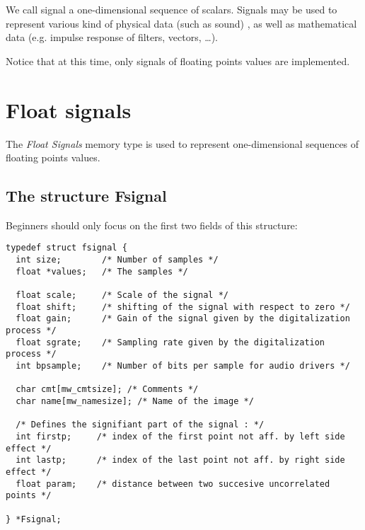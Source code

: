 %
%

We call signal a one-dimensional sequence of scalars. 
Signals may be used to represent various kind of physical data (such
as sound) , as well as mathematical data (e.g. impulse response of filters, 
vectors, \ldots).

Notice that at this time, only signals of floating points values are
implemented.

\section{Float signals}


\label{signals_float-signals}
\def\fsignal{{\tt Fsignal}}
\index{structure!\fsignal}

The {\em Float Signals} memory type is used to represent one-dimensional 
sequences of floating points values.

\subsection{The structure Fsignal}
\label{signals_float-signals_structure}


 Beginners should only focus on the first two fields of this structure:
{\small
\begin{verbatim}
typedef struct fsignal {
  int size;        /* Number of samples */
  float *values;   /* The samples */

  float scale;     /* Scale of the signal */
  float shift;     /* shifting of the signal with respect to zero */
  float gain;      /* Gain of the signal given by the digitalization process */
  float sgrate;    /* Sampling rate given by the digitalization process */
  int bpsample;    /* Number of bits per sample for audio drivers */

  char cmt[mw_cmtsize]; /* Comments */
  char name[mw_namesize]; /* Name of the image */
  
  /* Defines the signifiant part of the signal : */
  int firstp;     /* index of the first point not aff. by left side effect */
  int lastp;      /* index of the last point not aff. by right side effect */
  float param;    /* distance between two succesive uncorrelated points */

} *Fsignal;
\end{verbatim}
}

